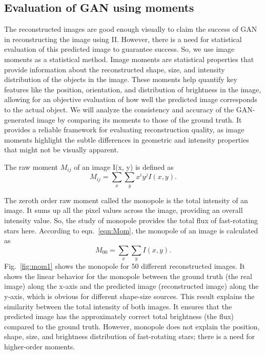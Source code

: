 \subsection{Evaluation of GAN using moments}
The reconstructed images are good enough visually to claim the success of GAN in reconstructing the image using II. However, there is a need for statistical evaluation of this predicted image to guarantee success. So, we use image moments as a statistical method. Image moments are statistical properties that provide information about the reconstructed shape, size, and intensity distribution of the objects in the image. These moments help quantify key features like the position, orientation, and distribution of brightness in the image, allowing for an objective evaluation of how well the predicted image corresponds to the actual object. We will analyze the consistency and accuracy of the GAN-generated image by comparing its moments to those of the ground truth. It provides a reliable framework for evaluating reconstruction quality, as image moments highlight the subtle differences in geometric and intensity properties that might not be visually apparent. 

The raw moment $M_{ij}$ of an image I(x, y) is defined as \citep{hu1962visual}
\begin{equation}
	M_{ij} = \sum_{x} \sum_{y} x^i y^j I(x, y).
	\label{eqn:Mom}
\end{equation}

The zeroth order raw moment called the monopole is the total intensity of an image. It sums up all the pixel values across the image, providing an overall intensity value. So, the study of monopole provides the total flux of fast-rotating stars here. According to eqn.~\ref{eqn:Mom}, the monopole of an image is calculated as 
\begin{equation}
	M_{00} = \sum_{x} \sum_{y} I(x, y).
\end{equation}
Fig.~\ref{fig:mom1} shows the monopole for 50 different reconstructed images. It shows the linear behavior for the monopole between the ground truth (the real image) along the x-axis and the predicted image (reconstructed image) along the y-axis, which is obvious for different shape-size sources. This result explains the similarity between the total intensity of both images. It ensures that the predicted image has the approximately correct total brightness (the flux) compared to the ground truth. However, monopole does not explain the position, shape, size, and brightness distribution of fast-rotating stars; there is a need for higher-order moments.

